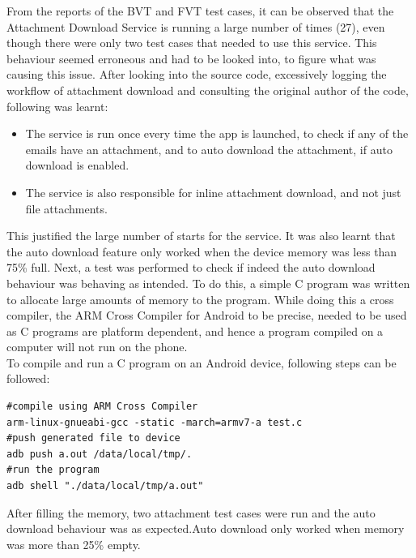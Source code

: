 From the reports of the BVT and FVT test cases, it can be observed that the Attachment Download Service is running a large number of times (27), even though there were only two test cases that needed to use this service. This behaviour seemed erroneous and had to be looked into, to figure what was causing this issue. After looking into the source code, excessively logging the workflow of attachment download and consulting the original author of the code, following was learnt:
\begin{itemize}
	\item The service is run once every time the app is launched, to check if any of the emails have an attachment, and to auto download the attachment, if auto download is enabled.
	\item The service is also responsible for inline attachment download, and not just file attachments.
\end{itemize}
This justified the large number of starts for the service. It was also learnt that the auto download feature only worked when the device memory was less than 75\% full. Next, a test was performed to check if indeed the auto download behaviour was behaving as intended. To do this, a simple C program was written to allocate large amounts of memory to the program. While doing this a cross compiler, the ARM Cross Compiler for Android to be precise, needed to be used as C programs are platform dependent, and hence a program compiled on a computer will not run on the phone.\\

To compile and run a C program on an Android device, following steps can be followed:
\begin{lstlisting}[style=ShellStyle]
#compile using ARM Cross Compiler
arm-linux-gnueabi-gcc -static -march=armv7-a test.c 
#push generated file to device
adb push a.out /data/local/tmp/.
#run the program
adb shell "./data/local/tmp/a.out"  
\end{lstlisting}
After filling the memory, two attachment test cases were run and the auto download behaviour was as expected.Auto download only worked when memory was more than 25\% empty.\\

